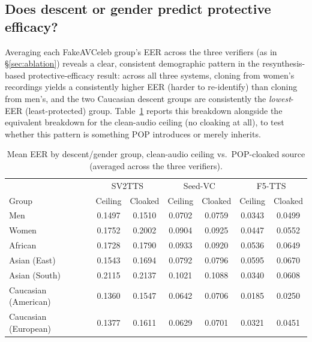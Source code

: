 \documentclass[11pt]{article}
\begin{document}
\subsection{Does descent or gender predict protective efficacy?}
\label{sec:protective-efficacy-demographics}

Averaging each FakeAVCeleb group's EER across the three verifiers (as
in \S\ref{sec:ablation}) reveals a clear, consistent demographic
pattern in the resynthesis-based protective-efficacy result: across
all three systems, cloning from women's recordings yields a
consistently higher EER (harder to re-identify) than cloning from
men's, and the two Caucasian descent groups are consistently the
\emph{lowest}-EER (least-protected) group. Table~\ref{tab:protective-efficacy-demographics}
reports this breakdown alongside the equivalent breakdown for the
clean-audio ceiling (no cloaking at all), to test whether this pattern
is something POP introduces or merely inherits.

\begin{table}[H]
\centering
\caption{Mean EER by descent/gender group, clean-audio ceiling vs.\
POP-cloaked source (averaged across the three verifiers).}
\label{tab:protective-efficacy-demographics}
\begin{tabular}{lcccccc}
\toprule
& \multicolumn{2}{c}{SV2TTS} & \multicolumn{2}{c}{Seed-VC} & \multicolumn{2}{c}{F5-TTS} \\
Group & Ceiling & Cloaked & Ceiling & Cloaked & Ceiling & Cloaked \\
\midrule
Men                  & 0.1497 & 0.1510 & 0.0702 & 0.0759 & 0.0343 & 0.0499 \\
Women                & 0.1752 & 0.2002 & 0.0904 & 0.0925 & 0.0447 & 0.0552 \\
\addlinespace
African              & 0.1728 & 0.1790 & 0.0933 & 0.0920 & 0.0536 & 0.0649 \\
Asian (East)         & 0.1543 & 0.1694 & 0.0792 & 0.0796 & 0.0595 & 0.0670 \\
Asian (South)        & 0.2115 & 0.2137 & 0.1021 & 0.1088 & 0.0340 & 0.0608 \\
Caucasian (American)  & 0.1360 & 0.1547 & 0.0642 & 0.0706 & 0.0185 & 0.0250 \\
Caucasian (European)  & 0.1377 & 0.1611 & 0.0629 & 0.0701 & 0.0321 & 0.0451 \\
\bottomrule
\end{tabular}
\end{table}
\end{document}
